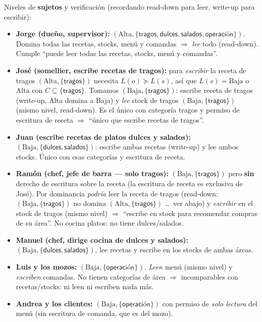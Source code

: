 Niveles de \textbf{sujetos} y verificación (recordando read-down para leer, write-up para
escribir):
\begin{itemize}
  \item \textbf{Jorge (dueño, supervisor):} $(\text{Alta},\{\textsf{tragos},\textsf{dulces},\textsf{salados},\textsf{operación}\})$.
        Domina todas las recetas, stocks, menú y comandas $\Rightarrow$ \emph{lee} todo
        (read-down). Cumple ``puede leer todas las recetas, stocks, menú y comandas''.
  \item \textbf{José (somellier, escribe recetas de tragos):} para \emph{escribir} la receta
        de tragos $(\text{Alta},\{\textsf{tragos}\})$ necesita $L(o)\succeq L(s)$, así que
        $L(s)=\text{Baja}$ o $\text{Alta}$ con $C \subseteq \{\textsf{tragos}\}$. Tomamos
        $(\text{Baja},\{\textsf{tragos}\})$: escribe receta de tragos (write-up, Alta domina a
        Baja) y \emph{lee} stock de tragos $(\text{Baja},\{\textsf{tragos}\})$ (mismo nivel,
        read-down). Es el único con categoría \textsf{tragos} y permiso de escritura de receta
        $\Rightarrow$ ``único que escribe recetas de tragos''.
  \item \textbf{Juan (escribe recetas de platos dulces y salados):}
        $(\text{Baja},\{\textsf{dulces},\textsf{salados}\})$: escribe ambas recetas (write-up) y
        lee ambos stocks. Único con esas categorías y escritura de receta.
  \item \textbf{Ramón (chef, jefe de barra — solo tragos):}
        $(\text{Baja},\{\textsf{tragos}\})$ pero \textbf{sin} derecho de escritura sobre la
        receta (la escritura de receta es exclusiva de José). Por dominancia \emph{podría}
        leer la receta de tragos (read-down: $(\text{Baja},\{\textsf{tragos}\})$ no domina
        $(\text{Alta},\{\textsf{tragos}\})$ \dots\ ver abajo) y \emph{escribir} en el stock de
        tragos (mismo nivel) $\Rightarrow$ ``escribe en stock para recomendar compras de su
        área''. No cocina platos: no tiene \textsf{dulces}/\textsf{salados}.
  \item \textbf{Manuel (chef, dirige cocina de dulces y salados):}
        $(\text{Baja},\{\textsf{dulces},\textsf{salados}\})$, lee recetas y escribe en los
        stocks de ambas áreas.
  \item \textbf{Luis y los mozos:} $(\text{Baja},\{\textsf{operación}\})$. \emph{Leen} menú
        (mismo nivel) y \emph{escriben} comandas. No tienen categorías de área $\Rightarrow$
        incomparables con recetas/stocks: ni leen ni escriben nada más.
  \item \textbf{Andrea y los clientes:} $(\text{Baja},\{\textsf{operación}\})$ con permiso de
        \emph{solo lectura} del menú (sin escritura de comanda, que es del mozo).
\end{itemize}

